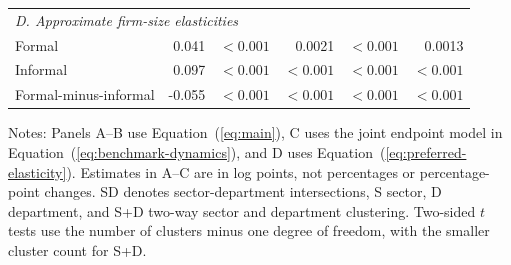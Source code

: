 \begin{table}[htbp]
\begin{tabular}{@{}p{}rrrrr@{}}
    \midrule
    \multicolumn{6}{l}{\textit{D. Approximate firm-size elasticities}} \\
    Formal & 0.041 & $<0.001$ & 0.0021 & $<0.001$ & 0.0013 \\
    Informal & 0.097 & $<0.001$ & $<0.001$ & $<0.001$ & $<0.001$ \\
    Formal-minus-informal & -0.055 & $<0.001$ & $<0.001$ & $<0.001$ & $<0.001$ \\
    \bottomrule
  \end{tabular}
  \vspace{0.3em}
  \begin{minipage}{0.98\textwidth}
    \footnotesize
    Notes: Panels A--B use Equation~(\ref{eq:main}), C uses the joint endpoint model in Equation~(\ref{eq:benchmark-dynamics}), and D uses Equation~(\ref{eq:preferred-elasticity}). Estimates in A--C are in log points, not percentages or percentage-point changes. SD denotes sector-department intersections, S sector, D department, and S+D two-way sector and department clustering. Two-sided $t$ tests use the number of clusters minus one degree of freedom, with the smaller cluster count for S+D.
  \end{minipage}
\end{table}
